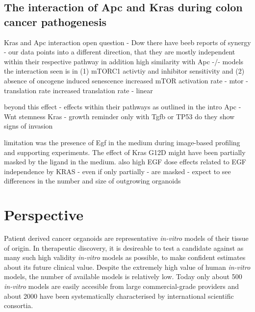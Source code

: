 \begin{flushleft}
\subsection{The interaction of Apc and Kras during colon cancer pathogenesis}
Kras and Apc interaction open question - Dow
there have beeb reports of synergy \citep{luoMutatedRasAsp122009} - our data points into a different direction, that they are mostly independent within their respective pathway 
in addition high similarity with Apc -/- models
the interaction seen is in (1) mTORC1 activtiy and inhibitor sensitivity and (2) absence of oncogene induced senescence 
increased mTOR activation rate - mtor - translation rate
increased translation rate \citep{smitDriverMutationsAdenomacarcinoma2020a} - linear

beyond this effect - effects within their pathways
as outlined in the intro 
Apc - Wnt stemness 
Kras - growth
reminder only with Tgfb or TP53 do they show signs of invasion
\par

limitation was the presence of Egf in the medium during image-based profiling and supporting experiments. The effect of Kras G12D might have been partially masked by the ligand in the medium. 
also high EGF dose
effects related to EGF independence by KRAS - even if only partially - are masked - 
expect to see differences in the number and size of outgrowing organoids


\section{Perspective}

Patient derived cancer organoids are representative \textit{in-vitro} models of their tissue of origin. In therapeutic discovery, it is desireable to test a candidate against as many such high validity \textit{in-vitro} models as possible, to make confident estimates about its future clinical value. Despite the extremely high value of human \textit{in-vitro} models, the number of available models is relatively low. Today only about 500 \textit{in-vitro} models are easily accesible from large commercial-grade providers and about 2000 have been systematically characterised by international scientific consortia. 


\end{flushleft}
